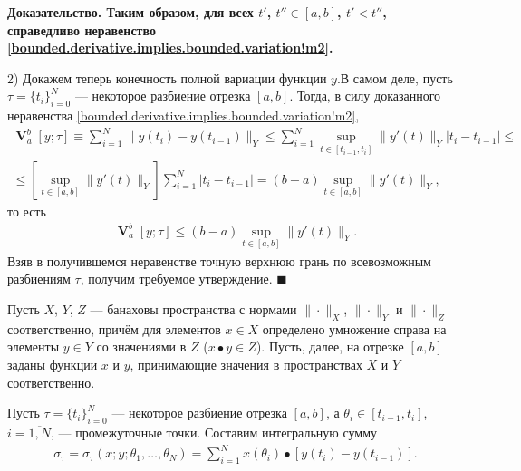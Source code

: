 \documentclass{report}
\newenvironment{Proof}{\par\noindent\bf Доказательство.\rm}{ $\blacksquare$\par}
\newcommand{\Var}{\mathop{\mathbf{V}}\nolimits}
\begin{document}
\begin{Proof}
Таким образом, для всех $t'$, $t''\in[a,b]$, $t'<t''$, справедливо неравенство \eqref{bounded.derivative.implies.bounded.variation!m2}.

2) Докажем теперь конечность полной вариации функции $y$.В самом деле, пусть $\tau=\{t_i\}_{i=0}^N$ --- некоторое разбиение отрезка $[a,b]$. Тогда, в силу доказанного неравенства
\eqref{bounded.derivative.implies.bounded.variation!m2},
\begin{gather*}
\Var^{b}_{a}[y;\tau]\equiv\sum\limits_{i=1}^N\|y(t_i)-y(t_{i-1})\|_Y\leqslant\sum\limits_{i=1}^N\sup\limits_{t\in[t_{i-1},t_i]}\|y'(t)\|_Y|t_i-t_{i-1}|\leqslant\\
\leqslant[\sup\limits_{t\in[a,b]}\|y'(t)\|_Y]\sum\limits_{i=1}^N|t_i-t_{i-1}|=(b-a)\sup\limits_{t\in[a,b]}\|y'(t)\|_Y,
\end{gather*}
то есть
\begin{gather*}
\Var^{b}_{a}[y;\tau]\leqslant(b-a)\sup\limits_{t\in[a,b]}\|y'(t)\|_Y.
\end{gather*}
Взяв в получившемся неравенстве точную верхнюю грань по всевозможным разбиениям $\tau$, получим требуемое утверждение.
\end{Proof}

Пусть $X$, $Y$, $Z$ --- банаховы пространства с нормами $\|\cdot\|_X$, $\|\cdot\|_Y$ и $\|\cdot\|_Z$ соответственно, причём для элементов $x\in X$ определено умножение справа на элементы
$y\in Y$ со значениями в $Z$ ($x\bullet y\in Z$). Пусть, далее, на отрезке $[a,b]$ заданы функции $x$ и $y$, принимающие значения в пространствах $X$ и $Y$ соответственно.

Пусть $\tau=\{t_i\}_{i=0}^N$ --- некоторое разбиение отрезка $[a,b]$, а $\theta_i\in[t_{i-1},t_i]$, $i=\overline{1,N}$, --- промежуточные точки. Составим интегральную сумму
\begin{gather*}
\sigma_\tau=\sigma_\tau(x;y;\theta_1,\dots,\theta_N)=\sum\limits_{i=1}^Nx(\theta_i)\bullet[y(t_i)-y(t_{i-1})].
\end{gather*}
\end{document}
